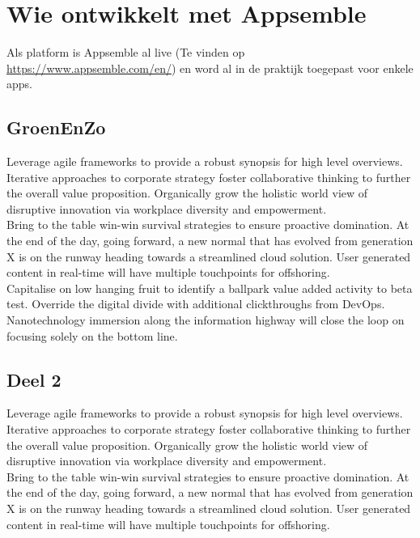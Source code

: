 \chapter{Wie ontwikkelt met Appsemble}


Als platform is Appsemble al live (Te vinden op \href{https://www.appsemble.com/en/}{https://www.appsemble.com/en/}) en word al in de praktijk toegepast voor enkele apps.

\section{GroenEnZo}

Leverage agile frameworks to provide a robust synopsis for high level overviews. Iterative approaches to corporate strategy foster collaborative thinking to further the overall value proposition. Organically grow the holistic world view of disruptive innovation via workplace diversity and empowerment.\\

Bring to the table win-win survival strategies to ensure proactive domination. At the end of the day, going forward, a new normal that has evolved from generation X is on the runway heading towards a streamlined cloud solution. User generated content in real-time will have multiple touchpoints for offshoring. \\

Capitalise on low hanging fruit to identify a ballpark value added activity to beta test. Override the digital divide with additional clickthroughs from DevOps. Nanotechnology immersion along the information highway will close the loop on focusing solely on the bottom line. 

\section{Deel 2}

Leverage agile frameworks to provide a robust synopsis for high level overviews. Iterative approaches to corporate strategy foster collaborative thinking to further the overall value proposition. Organically grow the holistic world view of disruptive innovation via workplace diversity and empowerment.\\

Bring to the table win-win survival strategies to ensure proactive domination. At the end of the day, going forward, a new normal that has evolved from generation X is on the runway heading towards a streamlined cloud solution. User generated content in real-time will have multiple touchpoints for offshoring. \\

